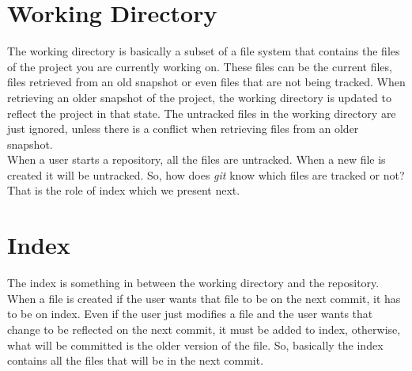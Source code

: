 \section{Working Directory}

The working directory is basically a subset of
a file system that contains the files of the project you are
currently working on. These files can be the current files, files
retrieved from an old snapshot or even files that are not being
tracked. When retrieving an older snapshot of the project, the
working directory is updated to reflect the project in that state. The
untracked files in the working directory are just ignored, unless
there is a conflict when retrieving files from an older snapshot.\\

When a user starts a repository, all the files are untracked. When a
new file is created it will be untracked. So, how does \emph{git} know which
files are tracked or not? That is the role of index which we present
next.

\section{Index}
The index is something in between the working directory and the
repository. When a file is created if the user wants that file to be
on the next commit, it has to be on index. Even if the user just
modifies a file and the user wants that change to be reflected on the
next commit, it must be added to index, otherwise, what will be
committed is the older version of the file. So, basically the index
contains all the files that will be in the next commit.\\

